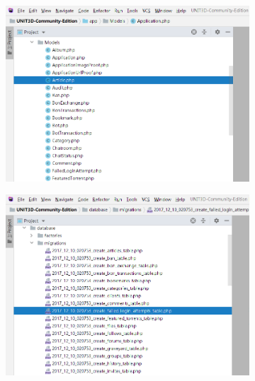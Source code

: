 \begin{figure}[!ht]
\begin{subfigure}{0.3\textwidth}
		\caption{ }
		\label{fig:torrent_in_bencode}
	\end{subfigure} \\
    \begin{subfigure}{0.3\textwidth}
		\centering
		\includegraphics[width=\textwidth]{support-files/3.1-phpstorm-folder-structure-3.png}
		\caption{ }
		\label{fig:torrent_in_bencode}
	\end{subfigure} 
	\makebox[0.05\textwidth]{}
    \begin{subfigure}{0.3\textwidth}
		\centering
		\includegraphics[width=\textwidth]{support-files/3.1-phpstorm-folder-structure-4.png}
		\caption{ }
		\label{fig:torrent_in_bencode}
	\end{subfigure} \\

\end{figure}
